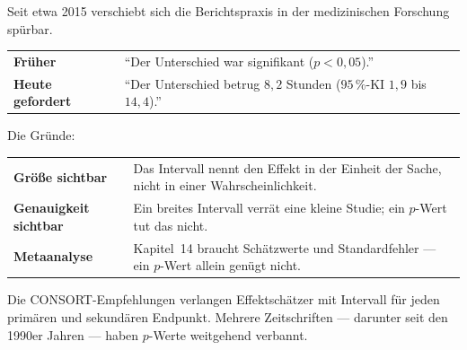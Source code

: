 \begin{forschung}
Seit etwa 2015 verschiebt sich die Berichtspraxis in der medizinischen Forschung spürbar.

\begin{center}
{\small
\renewcommand{\arraystretch}{1.45}
\begin{tabular}{@{}P{2.6cm}P{5.6cm}@{}}
\toprule
\textbf{Früher} & \enquote{Der Unterschied war signifikant ($p < 0{,}05$).}\\
\textbf{Heute gefordert} & \enquote{Der Unterschied betrug $8{,}2$ Stunden ($95\,\%$-KI $1{,}9$ bis $14{,}4$).}\\
\bottomrule
\end{tabular}}
\end{center}

Die Gründe:

\begin{center}
\renewcommand{\arraystretch}{1.5}
\begin{tabular}{@{}P{2.6cm}P{6.0cm}@{}}
\toprule
\textbf{Größe sichtbar} & Das Intervall nennt den Effekt in der Einheit der Sache, nicht in einer Wahrscheinlichkeit.\\
\textbf{Genauigkeit sichtbar} & Ein breites Intervall verrät eine kleine Studie; ein $p$-Wert tut das nicht.\\
\textbf{Metaanalyse} & Kapitel~14 braucht Schätzwerte und Standardfehler --- ein $p$-Wert allein genügt nicht.\\
\bottomrule
\end{tabular}
\end{center}

Die CONSORT-Empfehlungen verlangen Effektschätzer mit Intervall für jeden primären und sekundären Endpunkt. Mehrere Zeitschriften --- darunter  seit den 1990er Jahren --- haben $p$-Werte weitgehend verbannt.

\begin{center}
\begin{minipage}{0.88\textwidth}
\end{minipage}
\end{center}
\end{forschung}


